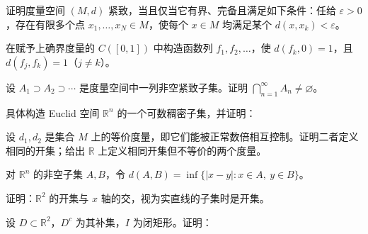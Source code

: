 \noindent\begin{minipage}{\textwidth}
证明度量空间 $(M,d)$ 紧致，当且仅当它有界、完备且满足如下条件：任给 $\varepsilon>0$，存在有限多个点 $x_1,\ldots,x_N\in M$，使每个 $x\in M$ 均满足某个 $d(x,x_k)<\varepsilon$。
\end{minipage}\par\vfill
\newpage
\noindent\begin{minipage}{\textwidth}
在赋予上确界度量的 $C([0,1])$ 中构造函数列 $f_1,f_2,\ldots$，使 $d(f_k,0)=1$，且 $d(f_j,f_k)=1$（$j\ne k$）。
\end{minipage}\par\vfill
\noindent\begin{minipage}{\textwidth}
设 $A_1\supset A_2\supset\cdots$ 是度量空间中一列非空紧致子集。证明 $\bigcap_{n=1}^{\infty}A_n\ne\varnothing$。
\end{minipage}\par\vfill
\noindent\begin{minipage}{\textwidth}
具体构造 Euclid 空间 $\mathbb R^n$ 的一个可数稠密子集，并证明：
\end{minipage}\par\vfill
\noindent\begin{minipage}{\textwidth}
设 $d_1,d_2$ 是集合 $M$ 上的等价度量，即它们能被正常数倍相互控制。证明二者定义相同的开集；给出 $\mathbb R$ 上定义相同开集但不等价的两个度量。
\end{minipage}\par\vfill
\newpage
\noindent\begin{minipage}{\textwidth}
对 $\mathbb R^n$ 的非空子集 $A,B$，令 $d(A,B)=\inf\{|x-y|:x\in A,\ y\in B\}$。
\end{minipage}\par\vfill
\noindent\begin{minipage}{\textwidth}
证明：$\mathbb R^2$ 的开集与 $x$ 轴的交，视为实直线的子集时是开集。
\end{minipage}\par\vfill
\noindent\begin{minipage}{\textwidth}
设 $D\subset\mathbb R^2$，$D^c$ 为其补集，$I$ 为闭矩形。证明：
\end{minipage}\par\vfill
